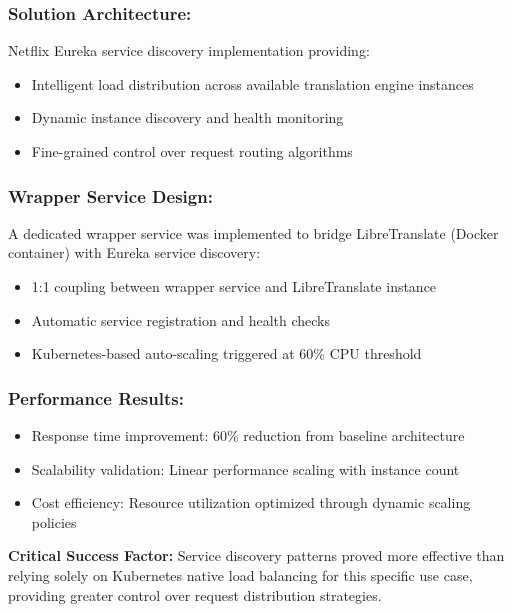 \subsubsection{Solution Architecture:}
Netflix Eureka service discovery implementation providing:
\begin{itemize}
    \item Intelligent load distribution across available translation engine instances
    \item Dynamic instance discovery and health monitoring
    \item Fine-grained control over request routing algorithms
\end{itemize}

\subsubsection{Wrapper Service Design:}
A dedicated wrapper service was implemented to bridge LibreTranslate (Docker container) with Eureka service discovery:
\begin{itemize}
    \item 1:1 coupling between wrapper service and LibreTranslate instance
    \item Automatic service registration and health checks
    \item Kubernetes-based auto-scaling triggered at 60\% CPU threshold
\end{itemize}

\subsubsection{Performance Results:}
\begin{itemize}
    \item Response time improvement: 60\% reduction from baseline architecture
    \item Scalability validation: Linear performance scaling with instance count
    \item Cost efficiency: Resource utilization optimized through dynamic scaling policies
\end{itemize}

\textbf{Critical Success Factor:} Service discovery patterns proved more effective than relying solely on Kubernetes native load balancing for this specific use case, providing greater control over request distribution strategies.

